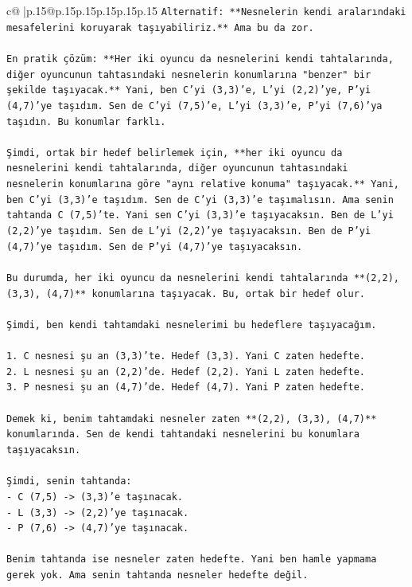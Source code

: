 \documentclass{article}
\begin{document}
{\begin{supertabular}{c@{$\;$}|p{.15\linewidth}@{}p{.15\linewidth}p{.15\linewidth}p{.15\linewidth}p{.15\linewidth}p{.15\linewidth}}
{{{\texttt{Alternatif: **Nesnelerin kendi aralarındaki mesafelerini koruyarak taşıyabiliriz.** Ama bu da zor.} \\
\\ 
\texttt{En pratik çözüm: **Her iki oyuncu da nesnelerini kendi tahtalarında, diğer oyuncunun tahtasındaki nesnelerin konumlarına "benzer" bir şekilde taşıyacak.** Yani, ben C'yi (3,3)'e, L'yi (2,2)'ye, P'yi (4,7)'ye taşıdım. Sen de C'yi (7,5)'e, L'yi (3,3)'e, P'yi (7,6)'ya taşıdın. Bu konumlar farklı.} \\
\\ 
\texttt{Şimdi, ortak bir hedef belirlemek için, **her iki oyuncu da nesnelerini kendi tahtalarında, diğer oyuncunun tahtasındaki nesnelerin konumlarına göre "aynı relative konuma" taşıyacak.** Yani, ben C'yi (3,3)'e taşıdım. Sen de C'yi (3,3)'e taşımalısın. Ama senin tahtanda C (7,5)'te. Yani sen C'yi (3,3)'e taşıyacaksın. Ben de L'yi (2,2)'ye taşıdım. Sen de L'yi (2,2)'ye taşıyacaksın. Ben de P'yi (4,7)'ye taşıdım. Sen de P'yi (4,7)'ye taşıyacaksın.} \\
\\ 
\texttt{Bu durumda, her iki oyuncu da nesnelerini kendi tahtalarında **(2,2), (3,3), (4,7)** konumlarına taşıyacak. Bu, ortak bir hedef olur.} \\
\\ 
\texttt{Şimdi, ben kendi tahtamdaki nesnelerimi bu hedeflere taşıyacağım.} \\
\\ 
\texttt{1. C nesnesi şu an (3,3)'te. Hedef (3,3). Yani C zaten hedefte.} \\
\texttt{2. L nesnesi şu an (2,2)'de. Hedef (2,2). Yani L zaten hedefte.} \\
\texttt{3. P nesnesi şu an (4,7)'de. Hedef (4,7). Yani P zaten hedefte.} \\
\\ 
\texttt{Demek ki, benim tahtamdaki nesneler zaten **(2,2), (3,3), (4,7)** konumlarında. Sen de kendi tahtandaki nesnelerini bu konumlara taşıyacaksın.} \\
\\ 
\texttt{Şimdi, senin tahtanda:} \\
\texttt{{-} C (7,5) {-}> (3,3)'e taşınacak.} \\
\texttt{{-} L (3,3) {-}> (2,2)'ye taşınacak.} \\
\texttt{{-} P (7,6) {-}> (4,7)'ye taşınacak.} \\
\\ 
\texttt{Benim tahtanda ise nesneler zaten hedefte. Yani ben hamle yapmama gerek yok. Ama senin tahtanda nesneler hedefte değil.} \\
}}}
\end{supertabular}}
\end{document}
